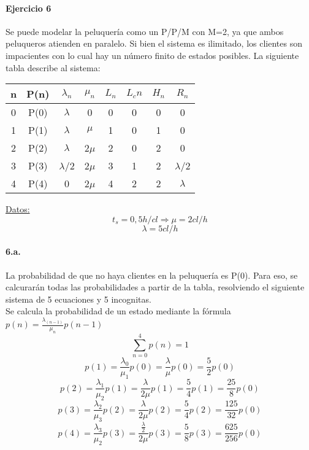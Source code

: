 \documentclass{article}
\begin{document}
    
\paragraph{Ejercicio 6}
    Se puede modelar la peluquería como un P/P/M con M=2, ya que ambos peluqueros atienden en paralelo. Si bien el sistema es ilimitado, los clientes son impacientes con lo cual hay un número finito de estados posibles.
    La siguiente tabla describe al sistema:
    \begin{center}
    \begin{tabular}{|| c | c | c | c | c | c | c | c ||}
    \hline 
     n & P(n) & $\lambda_n$ & $\mu_n$ & $L_n$& $L_cn$ & $H_n$ & $R_n$ \\ \hline \hline
     0 & P(0) & $\lambda$   & 0       & 0    & 0      & 0     & 0	\\ \hline
     1 & P(1) & $\lambda$   & $\mu$   & 1    & 0      & 1     & 0	\\ \hline
     2 & P(2) & $\lambda$   & 2$\mu$  & 2    & 0      & 2     & 0	\\ \hline
     3 & P(3) & $\lambda$/2 & 2$\mu$  & 3    & 1      & 2     & $\lambda$/2 \\ \hline
     4 & P(4) & 0           & 2$\mu$  & 4    & 2      & 2     & $\lambda$   \\ \hline  
     
    \end{tabular}
    \end{center}
    \underline{Datos:} \\
    $$t_s = 0,5 h/cl  \Rightarrow \mu = 2 cl/h $$
    $$\lambda = 5 cl/h $$
    
    \paragraph{6.a.} La probabilidad de que no haya clientes en la peluquería es P(0). Para eso, se calcurarán todas las probabilidades a partir de la tabla,
    resolviendo el siguiente sistema de 5 ecuaciones y 5 incognitas.\\
    Se calcula la probabilidad de un estado mediante la fórmula $p(n) = \frac{\lambda_(n-1)}{\mu_n} p(n-1)$
    $$ \sum_{n=0}^{4} p(n) = 1 $$
    $$ p(1) = \frac{\lambda_0}{\mu_1}p(0) = \frac{\lambda}{\mu}p(0) = \frac{5}{2}p(0)$$
    $$ p(2) = \frac{\lambda_1}{\mu_2}p(1) = \frac{\lambda}{2\mu}p(1) = \frac{5}{4}p(1) = \frac{25}{8}p(0)$$
    $$ p(3) = \frac{\lambda_2}{\mu_3}p(2) = \frac{\lambda}{2\mu}p(2) = \frac{5}{4}p(2) = \frac{125}{32}p(0)$$
    $$ p(4) = \frac{\lambda_3}{\mu_2}p(3) = \frac{\frac{\lambda}{2}}{2\mu}p(3) = \frac{5}{8}p(3) = \frac{625}{256}p(0)$$
    
\end{document}

